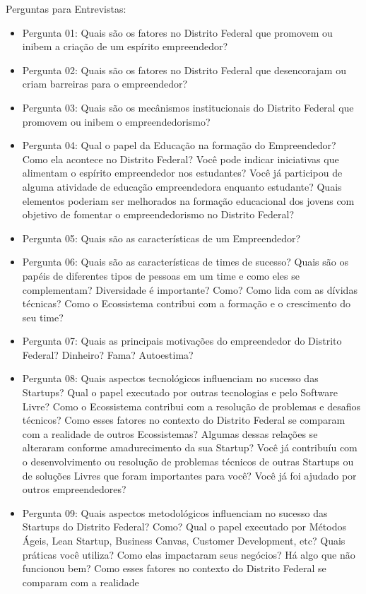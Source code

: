 Perguntas para Entrevistas:
\begin{itemize}
  \item Pergunta 01: Quais são os fatores no Distrito Federal que promovem ou inibem a criação de um espírito empreendedor?
  \item Pergunta 02: Quais são os fatores no Distrito Federal que desencorajam ou criam barreiras para o empreendedor?
  \item Pergunta 03: Quais são os mecânismos institucionais do Distrito Federal que promovem ou inibem o empreendedorismo?
  \item Pergunta 04: Qual o papel da Educação na formação do Empreendedor? Como ela acontece no Distrito Federal? Você pode indicar iniciativas que alimentam o espírito empreendedor nos estudantes?
  Você já participou de alguma atividade de educação empreendedora enquanto estudante? Quais elementos poderiam ser melhorados na formação educacional dos jovens com objetivo de fomentar o
  empreendedorismo no Distrito Federal?
  \item Pergunta 05: Quais são as características de um Empreendedor?
  \item Pergunta 06: Quais são as características de times de sucesso? Quais são os papéis de diferentes tipos de pessoas em um time e como eles se complementam? Diversidade é importante? Como?
  Como lida com as dívidas técnicas? Como o Ecossistema contribui com a formação e o crescimento do seu time?
  \item Pergunta 07: Quais as principais motivações do empreendedor do Distrito Federal? Dinheiro? Fama? Autoestima?
  \item Pergunta 08: Quais aspectos tecnológicos influenciam no sucesso das Startups? Qual o papel executado por outras tecnologias e pelo Software Livre? Como o Ecossistema contribui com a resolução
  de problemas e desafios técnicos? Como esses fatores no contexto do Distrito Federal se comparam com a realidade de outros Ecossistemas? Algumas dessas relações se alteraram conforme amadurecimento
  da sua Startup? Você já contribuíu com o desenvolvimento ou resolução de problemas técnicos de outras Startups ou de soluções Livres que foram importantes para você? Você já foi ajudado por outros
  empreendedores?
  \item Pergunta 09: Quais aspectos metodológicos influenciam no sucesso das Startups do Distrito Federal? Como? Qual o papel executado por Métodos Ágeis, Lean Startup, Business Canvas, Customer
  Development, etc? Quais práticas você utiliza? Como elas impactaram seus negócios? Há algo que não funcionou bem? Como esses fatores no contexto do Distrito Federal se comparam com a realidade

\end{itemize}
